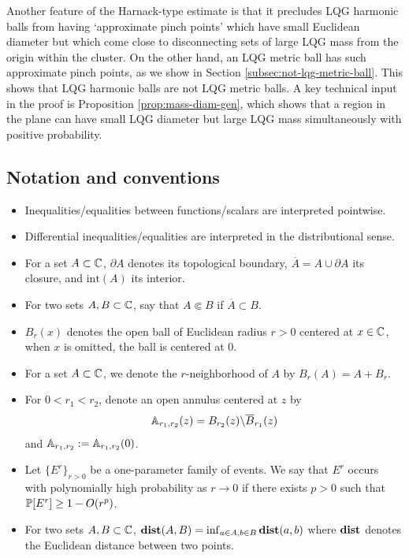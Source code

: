 \documentclass[12pt]{amsart}
\numberwithin{equation}{section}
\begin{document}
	Another feature of the Harnack-type estimate is that it precludes LQG harmonic balls from having `approximate pinch points' which have small Euclidean diameter but which come close to disconnecting sets of large LQG mass from the origin within the cluster. On the other hand, an LQG metric ball has such approximate pinch points, as we show in Section \ref{subsec:not-lqg-metric-ball}.
	This shows that LQG harmonic balls are not LQG metric balls. 
	A key technical input in the proof is Proposition \ref{prop:mass-diam-gen}, which shows that a region in the plane can have small LQG diameter but large LQG mass simultaneously with positive probability. 
	
	
	
	
	\subsection{Notation and conventions}
	\begin{itemize}
		\item Inequalities/equalities between functions/scalars are interpreted pointwise.
		\item Differential inequalities/equalities are interpreted in the distributional sense. 
		\item For a set $A \subset \C$, $\partial A$ denotes its topological boundary, $\overline{A} = A \cup \partial A$ its closure, 
		and $\mathrm{int}(A)$ its interior. 
		\item For two sets $A, B \subset \C$, say that $A \Subset B$ if $\overline{A} \subset B$. 
		\item $B_r(x)$ denotes the open ball of Euclidean radius $r > 0$ centered at $x \in \C$, when $x$ is omitted, the ball is centered at 0. 
		\item For a set $A \subset \C$, we denote the $r$-neighborhood of $A$ by $B_r(A) = A + B_r$.
		\item For $0 < r_1 < r_2$, denote an open annulus centered at $z$ by
		\begin{equation} \label{eq:annulus}
		\A_{r_1, r_2}(z) = B_{r_2}(z) \backslash \overline{B}_{r_1}(z)
		\end{equation}
		and $\A_{r_1, r_2} := \A_{r_1,r_2}(0)$. 
		\item Let $\{E^{r}\}_{r > 0}$ be a one-parameter family of events. 
		We say that $E^r$ occurs with polynomially high probability as $r \to 0$
		if there exists $p>0$ such that $\P[E^r] \geq 1 - O(r^p)$. 
		\item For two sets $A, B \subset \C$, $\dist(A,B) = \inf_{a \in A, b \in B} \dist(a,b)$ where $\dist$ denotes the Euclidean distance between two points. 
	\end{itemize}
	
\end{document}
